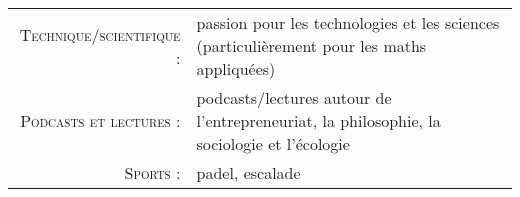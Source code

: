 %
%
%

\begin{tabular}{rl}
    \textsc{Technique/scientifique :} & passion pour les technologies et les sciences (particulièrement pour les maths appliquées)\\
    \textsc{Podcasts et lectures :} & podcasts/lectures autour de l'entrepreneuriat, la philosophie, la sociologie et l'écologie  \\ 
    \textsc{Sports :} & padel, escalade \\
\end{tabular}